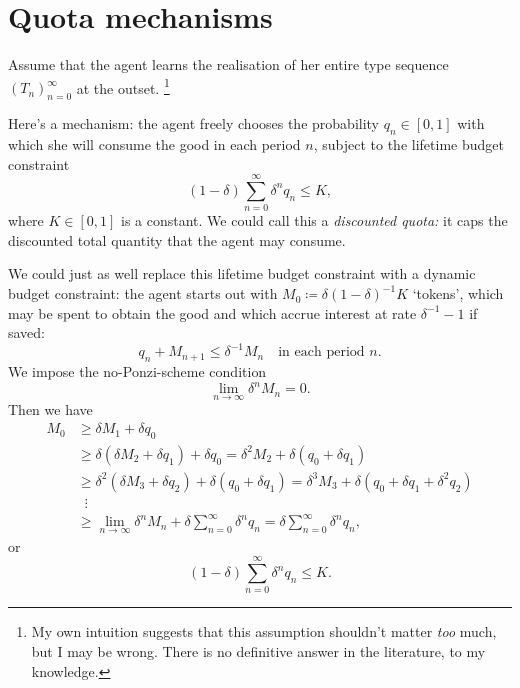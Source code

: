 \section{Quota mechanisms}
\label{sec:ch3:token}

Assume that the agent learns the realisation of her entire type sequence $(T_n)_{n=0}^\infty$ at the outset.%
	\footnote{My own intuition suggests that this assumption shouldn't matter \emph{too} much, but I may be wrong. There is no definitive answer in the literature, to my knowledge.}

Here's a mechanism:
the agent freely chooses
the probability $q_n \in [0,1]$ with which she will consume the good in each period $n$,
subject to the lifetime budget constraint
%
\begin{equation*}
	(1-\delta) \sum_{n=0}^\infty \delta^n q_n 
	\leq K ,
\end{equation*}
%
where $K \in [0,1]$ is a constant.
We could call this a \emph{discounted quota:}
it caps the discounted total quantity that the agent may consume.

We could just as well replace this lifetime budget constraint with a dynamic budget constraint: the agent starts out with $M_0 \coloneqq \delta (1-\delta)^{-1} K$ `tokens',
which may be spent to obtain the good and which accrue interest at rate $\delta^{-1}-1$ if saved:
%
\begin{equation*}
	q_n + M_{n+1}
	\leq \delta^{-1} M_n 
	\quad \text{in each period $n$.}
\end{equation*}
%
We impose the no-Ponzi-scheme condition
%
\begin{equation*}
	\lim_{n \to \infty} \delta^n M_n = 0 .
\end{equation*}
%
Then we have
%
\begin{align*}
	M_0
	&\geq \delta M_1 + \delta q_0
	\\
	&\geq \delta ( \delta M_2 + \delta q_1 )
	+ \delta q_0
	= \delta^2 M_2
	+ \delta ( q_0 + \delta q_1 )
	\\
	&\geq \delta^2 ( \delta M_3 + \delta q_2 )
	+ \delta ( q_0 + \delta q_1 )
	= \delta^3 M_3
	+ \delta \left( q_0 + \delta q_1 + \delta^2 q_2 \right)
	\\
	&\;\; \vdots
	\\
	&\geq \lim_{n \to \infty} \delta^n M_n
	+ \delta \sum_{n=0}^\infty \delta^n q_n 
	= \delta \sum_{n=0}^\infty \delta^n q_n ,
\end{align*}
%
or
%
\begin{equation*}
	(1-\delta) \sum_{n=0}^\infty \delta^n q_n
	\leq K.
\end{equation*}

